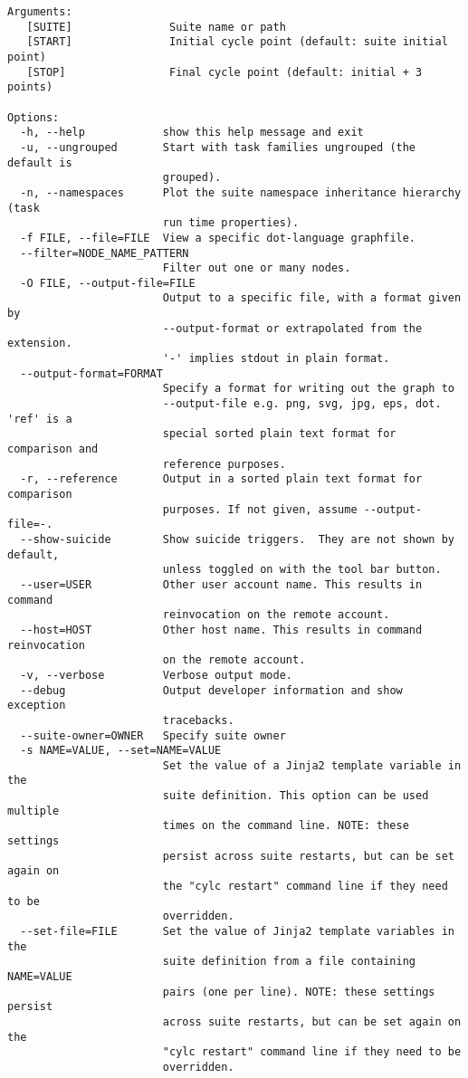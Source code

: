 \begin{lstlisting}
Arguments:
   [SUITE]               Suite name or path
   [START]               Initial cycle point (default: suite initial point)
   [STOP]                Final cycle point (default: initial + 3 points)

Options:
  -h, --help            show this help message and exit
  -u, --ungrouped       Start with task families ungrouped (the default is
                        grouped).
  -n, --namespaces      Plot the suite namespace inheritance hierarchy (task
                        run time properties).
  -f FILE, --file=FILE  View a specific dot-language graphfile.
  --filter=NODE_NAME_PATTERN
                        Filter out one or many nodes.
  -O FILE, --output-file=FILE
                        Output to a specific file, with a format given by
                        --output-format or extrapolated from the extension.
                        '-' implies stdout in plain format.
  --output-format=FORMAT
                        Specify a format for writing out the graph to
                        --output-file e.g. png, svg, jpg, eps, dot. 'ref' is a
                        special sorted plain text format for comparison and
                        reference purposes.
  -r, --reference       Output in a sorted plain text format for comparison
                        purposes. If not given, assume --output-file=-.
  --show-suicide        Show suicide triggers.  They are not shown by default,
                        unless toggled on with the tool bar button.
  --user=USER           Other user account name. This results in command
                        reinvocation on the remote account.
  --host=HOST           Other host name. This results in command reinvocation
                        on the remote account.
  -v, --verbose         Verbose output mode.
  --debug               Output developer information and show exception
                        tracebacks.
  --suite-owner=OWNER   Specify suite owner
  -s NAME=VALUE, --set=NAME=VALUE
                        Set the value of a Jinja2 template variable in the
                        suite definition. This option can be used multiple
                        times on the command line. NOTE: these settings
                        persist across suite restarts, but can be set again on
                        the "cylc restart" command line if they need to be
                        overridden.
  --set-file=FILE       Set the value of Jinja2 template variables in the
                        suite definition from a file containing NAME=VALUE
                        pairs (one per line). NOTE: these settings persist
                        across suite restarts, but can be set again on the
                        "cylc restart" command line if they need to be
                        overridden.
\end{lstlisting}
